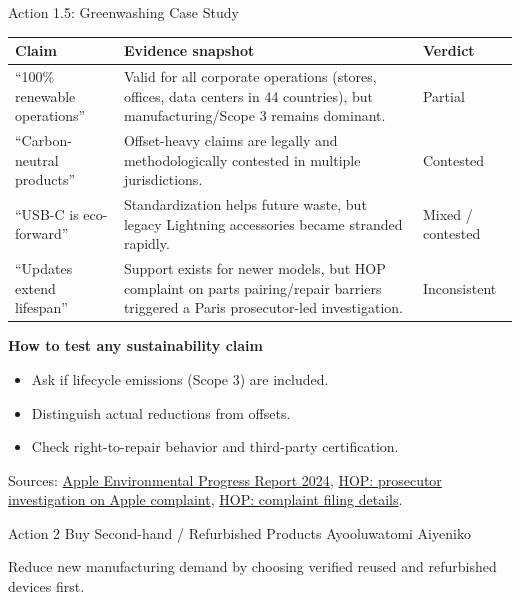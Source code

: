 \documentclass[aspectratio=169]{beamer}
\begin{document}
\begin{frame}{Action 1.5: Greenwashing Case Study}
\scriptsize
\begin{tabular}{p{2.5cm}p{5.6cm}p{2.2cm}}
\toprule
Claim & Evidence snapshot & Verdict \\
\midrule
``100\% renewable operations'' & Valid for all corporate operations (stores, offices, data centers in 44 countries), but manufacturing/Scope 3 remains dominant. & Partial \\
``Carbon-neutral products'' & Offset-heavy claims are legally and methodologically contested in multiple jurisdictions. & Contested \\
``USB-C is eco-forward'' & Standardization helps future waste, but legacy Lightning accessories became stranded rapidly. & Mixed / contested \\
``Updates extend lifespan'' & Support exists for newer models, but HOP complaint on parts pairing/repair barriers triggered a Paris prosecutor-led investigation. & Inconsistent \\
\bottomrule
\end{tabular}

\vspace{0.15cm}
\textbf{How to test any sustainability claim}
\begin{itemize}
  \item Ask if lifecycle emissions (Scope 3) are included.
  \item Distinguish actual reductions from offsets.
  \item Check right-to-repair behavior and third-party certification.
\end{itemize}
\vspace{0.05cm}
\tiny Sources: \href{https://www.apple.com/environment/pdf/Apple_Environmental_Progress_Report_2024.pdf}{Apple Environmental Progress Report 2024}, \href{https://www.halteobsolescence.org/plainte-contre-apple-le-procureur-de-la-republique-ouvre-lenquete/}{HOP: prosecutor investigation on Apple complaint}, \href{https://www.halteobsolescence.org/nouvelle-plainte-de-hop-contre-apple-pour-obsolescence-programmee-et-entraves-a-la-reparation/}{HOP: complaint filing details}.
\end{frame}


\renewcommand{\insertshortauthor}{Ayooluwatomi Aiyeniko et al.}

\begin{frame}
\centering
\vfill
{Action 2}
\vskip 0.3cm
{Buy Second-hand / Refurbished Products}
\vskip 0.2cm
{\small Ayooluwatomi Aiyeniko}
\vskip 0.5cm
\begin{minipage}{0.8\textwidth}
  \centering\small
  Reduce new manufacturing demand by choosing verified reused and refurbished devices first.
\end{minipage}
\vfill
\end{frame}
\end{document}
